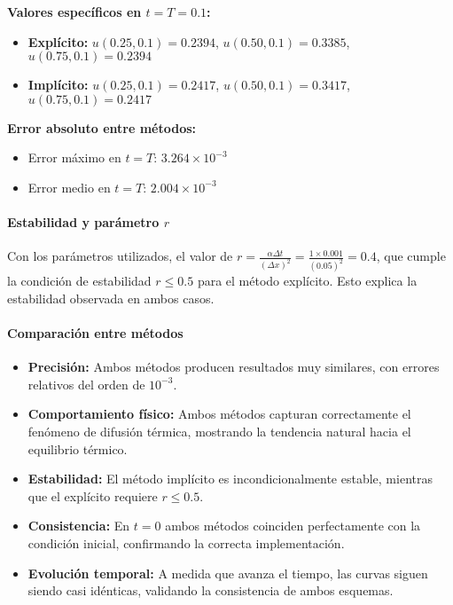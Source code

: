 \documentclass[12pt,a4paper]{article}
\begin{document}
\textbf{Valores específicos en $t = T = 0.1$:}
\begin{itemize}
    \item \textbf{Explícito:} $u(0.25, 0.1) = 0.2394$, $u(0.50, 0.1) = 0.3385$, $u(0.75, 0.1) = 0.2394$
    \item \textbf{Implícito:} $u(0.25, 0.1) = 0.2417$, $u(0.50, 0.1) = 0.3417$, $u(0.75, 0.1) = 0.2417$
\end{itemize}

\textbf{Error absoluto entre métodos:}
\begin{itemize}
    \item Error máximo en $t = T$: $3.264 \times 10^{-3}$
    \item Error medio en $t = T$: $2.004 \times 10^{-3}$
\end{itemize}

\paragraph{Estabilidad y parámetro $r$}

Con los parámetros utilizados, el valor de $r = \frac{\alpha \Delta t}{(\Delta x)^2} = \frac{1 \times 0.001}{(0.05)^2} = 0.4$, que cumple la condición de estabilidad $r \leq 0.5$ para el método explícito. Esto explica la estabilidad observada en ambos casos.

\paragraph{Comparación entre métodos}

\begin{itemize}
    \item \textbf{Precisión:} Ambos métodos producen resultados muy similares, con errores relativos del orden de $10^{-3}$.
    \item \textbf{Comportamiento físico:} Ambos métodos capturan correctamente el fenómeno de difusión térmica, mostrando la tendencia natural hacia el equilibrio térmico.
    \item \textbf{Estabilidad:} El método implícito es incondicionalmente estable, mientras que el explícito requiere $r \leq 0.5$.
    \item \textbf{Consistencia:} En $t=0$ ambos métodos coinciden perfectamente con la condición inicial, confirmando la correcta implementación.
    \item \textbf{Evolución temporal:} A medida que avanza el tiempo, las curvas siguen siendo casi idénticas, validando la consistencia de ambos esquemas.
\end{itemize}
\end{document}
